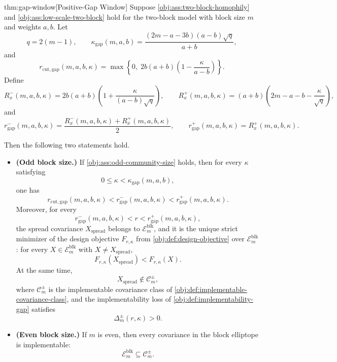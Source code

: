 \begin{theoremv}{thm:gap-window}[Positive-Gap Window]
Suppose \cref{obj:ass:two-block-homophily} and \cref{obj:ass:low-scale-two-block} hold for the two-block model with block size \(m\) and weights \(a,b\). Let
\[
q=2(m-1),\qquad
\kappa_{\mathrm{gap}}(m,a,b)
=
\frac{(2m-a-3b)(a-b)\sqrt q}{a+b},
\]
and
\[
r_{\mathrm{cut,gap}}(m,a,b,\kappa)
=
\max\left\{0,\;2b(a+b)\left(1-\frac{\kappa}{a-b}\right)\right\}.
\]
Define
\[
R_x^-(m,a,b,\kappa)
=
2b(a+b)\left(1+\frac{\kappa}{(a-b)\sqrt q}\right),
\qquad
R_x^+(m,a,b,\kappa)
=
(a+b)\left(2m-a-b-\frac{\kappa}{\sqrt q}\right),
\]
and
\[
r_{\mathrm{gap}}^-(m,a,b,\kappa)
=
\frac{R_x^-(m,a,b,\kappa)+R_x^+(m,a,b,\kappa)}{2},
\qquad
r_{\mathrm{gap}}^+(m,a,b,\kappa)
=
R_x^+(m,a,b,\kappa).
\]

Then the following two statements hold.
\begin{itemize}
\item \textbf{(Odd block size.)} If \cref{obj:ass:odd-community-size} holds, then for every \(\kappa\) satisfying
\[
0\le \kappa < \kappa_{\mathrm{gap}}(m,a,b),
\]
one has
\[
r_{\mathrm{cut,gap}}(m,a,b,\kappa)
<
r_{\mathrm{gap}}^-(m,a,b,\kappa)
<
r_{\mathrm{gap}}^+(m,a,b,\kappa).
\]
Moreover, for every
\[
r_{\mathrm{gap}}^-(m,a,b,\kappa)
<
r
<
r_{\mathrm{gap}}^+(m,a,b,\kappa),
\]
the spread covariance \(X_{\mathrm{spread}}\) belongs to \(\mathcal E_m^{\mathrm{blk}}\), and it is the unique strict minimizer of the design objective \(F_{r,\kappa}\) from \cref{obj:def:design-objective} over \(\mathcal E_m^{\mathrm{blk}}\): for every \(X\in \mathcal E_m^{\mathrm{blk}}\) with \(X\ne X_{\mathrm{spread}}\),
\[
F_{r,\kappa}(X_{\mathrm{spread}})<F_{r,\kappa}(X).
\]
At the same time,
\[
X_{\mathrm{spread}}\notin \mathcal C_m^{\pm},
\]
where \(\mathcal C_m^{\pm}\) is the implementable covariance class of \cref{obj:def:implementable-covariance-class}, and the implementability loss of \cref{obj:def:implementability-gap} satisfies
\[
\Delta_m^{\pm}(r,\kappa)>0.
\]

\item \textbf{(Even block size.)} If \(m\) is even, then every covariance in the block elliptope is implementable:
\[
\mathcal E_m^{\mathrm{blk}}\subseteq \mathcal C_m^{\pm}.
\]
\end{itemize}
\end{theoremv}

